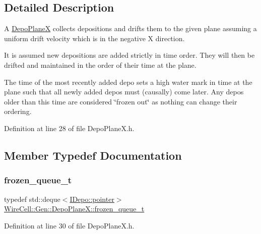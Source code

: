 \subsection{Detailed Description}
A \hyperlink{class_wire_cell_1_1_gen_1_1_depo_plane_x}{Depo\+PlaneX} collects depositions and drifts them to the given plane assuming a uniform drift velocity which is in the negative X direction.

It is assumed new depositions are added strictly in time order. They will then be drifted and maintained in the order of their time at the plane.

The time of the most recently added depo sets a high water mark in time at the plane such that all newly added depos must (causally) come later. Any depos older than this time are considered \char`\"{}frozen out\char`\"{} as nothing can change their ordering. 

Definition at line 28 of file Depo\+Plane\+X.\+h.



\subsection{Member Typedef Documentation}
\mbox{\label{class_wire_cell_1_1_gen_1_1_depo_plane_x_a4f4387d05fb9d3a02c96da6abac2861e}} 
\subsubsection{\texorpdfstring{frozen\+\_\+queue\+\_\+t}{frozen\_queue\_t}}
{\footnotesize\ttfamily typedef std\+::deque$<$\hyperlink{class_wire_cell_1_1_i_data_aff870b3ae8333cf9265941eef62498bc}{I\+Depo\+::pointer}$>$ \hyperlink{class_wire_cell_1_1_gen_1_1_depo_plane_x_a4f4387d05fb9d3a02c96da6abac2861e}{Wire\+Cell\+::\+Gen\+::\+Depo\+Plane\+X\+::frozen\+\_\+queue\+\_\+t}}



Definition at line 30 of file Depo\+Plane\+X.\+h.

\mbox{\label{class_wire_cell_1_1_gen_1_1_depo_plane_x_ade1129aabbdd7bc1d4e880169d715a19}} 
